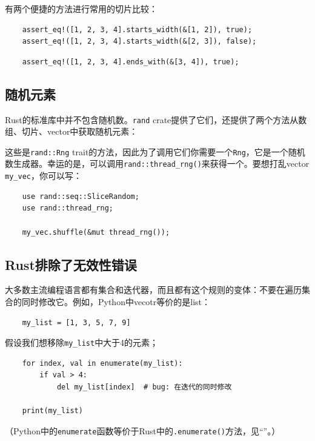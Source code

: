 有两个便捷的方法进行常用的切片比较：

\begin{verbatim}
    assert_eq!([1, 2, 3, 4].starts_width(&[1, 2]), true);
    assert_eq!([1, 2, 3, 4].starts_width(&[2, 3]), false);
\end{verbatim}

\begin{verbatim}
    assert_eq!([1, 2, 3, 4].ends_with(&[3, 4]), true);
\end{verbatim}

\subsection{随机元素}
Rust的标准库中并不包含随机数。\texttt{rand} crate提供了它们，还提供了两个方法从数组、切片、vector中获取随机元素：



这些是\texttt{rand::Rng} trait的方法，因此为了调用它们你需要一个\texttt{Rng}，它是一个随机数生成器。幸运的是，可以调用\texttt{rand::thread\_rng()}来获得一个。要想打乱vector \texttt{my\_vec}，你可以写：
\begin{verbatim}
    use rand::seq::SliceRandom;
    use rand::thread_rng;

    my_vec.shuffle(&mut thread_rng());
\end{verbatim}

\subsection{Rust排除了无效性错误}
大多数主流编程语言都有集合和迭代器，而且都有这个规则的变体：不要在遍历集合的同时修改它。例如，Python中vecotr等价的是list：
\begin{verbatim}
    my_list = [1, 3, 5, 7, 9]
\end{verbatim}

假设我们想移除\texttt{my\_list}中大于4的元素；
\begin{verbatim}
    for index, val in enumerate(my_list):
        if val > 4:
            del my_list[index]  # bug: 在迭代的同时修改
    
    print(my_list)
\end{verbatim}
（Python中的\texttt{enumerate}函数等价于Rust中的\texttt{.enumerate()}方法，见“”。）

